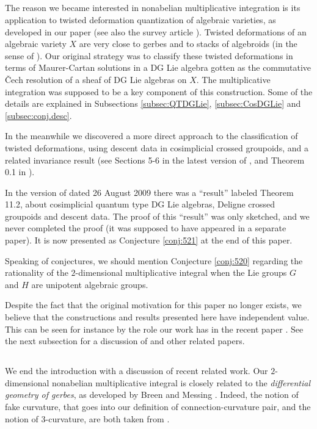 \documentclass[10pt, a4paper]{amsart}
\theoremstyle{definition}
\numberwithin{equation}{section}
\begin{document}
\subsection{} \label{subsec:motiv}
The reason we became interested in nonabelian multiplicative integration is its
application to twisted deformation quantization of algebraic
varieties, as developed in our paper \cite{Ye3} (see also the survey article
\cite{Ye4}). Twisted deformations of an algebraic variety $X$ are very close to
gerbes and to stacks of algebroids (in the sense of \cite{Ko}). 
Our original strategy was to classify these twisted deformations in
terms of Maurer-Cartan solutions in a DG Lie algebra gotten as the commutative
\v{C}ech resolution of a sheaf of DG Lie algebras on $X$. The multiplicative
integration was supposed to be a key component of this construction. Some of the
details are explained in Subsections \ref{subsec:QTDGLie}, \ref{subsec:CosDGLie}
and  \ref{subsec:conj.desc}.

In the meanwhile we discovered a more direct approach to the classification of
twisted deformations, using descent data in cosimplicial crossed groupoids, and
a related invariance result (see Sections 5-6 in the latest version of
\cite{Ye3}, and Theorem 0.1 in \cite{Ye6}). 

In the version of \cite{Ye3} dated 26 August 2009 there was a ``result''
labeled Theorem 11.2, about cosimplicial quantum type DG Lie algebras,
Deligne crossed groupoids and descent data. 
The proof of this ``result'' was only sketched, and we never completed the
proof (it was supposed to have appeared in a separate paper). It is now
presented as Conjecture \ref{conj:521} at the end of this paper. 

Speaking of conjectures, we should mention Conjecture \ref{conj:520} regarding
the rationality of the $2$-dimensional multiplicative integral when the Lie
groups $G$ and $H$ are unipotent algebraic groups. 

Despite the fact that the original motivation for this paper no longer exists,
we believe that the constructions and results presented here have 
independent value. This can be seen for instance by the role our work has in
the recent paper \cite{BGNT}. See the next subsection for a discussion of 
\cite{BGNT} and other related papers. 


\subsection{} \label{subsec:compare}
We end the introduction with a discussion of recent related work. 
Our $2$-dimensional nonabelian multiplicative integral is closely related to
the {\em differential geometry of gerbes}, as developed by Breen and Messing
\cite{BM}. Indeed, the notion of fake curvature, that goes into our definition
of connection-curvature pair, and the notion of $3$-curvature, are both taken
from \cite{BM}. 
\end{document}
